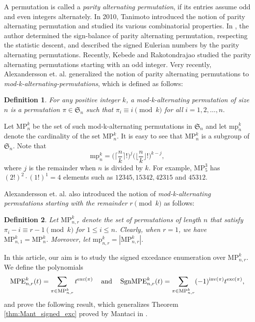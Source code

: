\documentclass[12pt]{article}
\newcommand{\MP}{\mathrm{MP}}
\newcommand{\MPE}{\mathrm{MPE}}
\newcommand{\SMPE}{\mathrm{SgnMPE}}
\newcommand{\mpa}{\mathrm{mp}}
\newcommand{\SSS}{\mathfrak{S}}
\newcommand{\inv}{\mathrm{inv}}
\newcommand{\exc}{\mathrm{exc}}
\newtheorem{definition}{\bf Definition}[section]
\begin{document}
 

A permutation is called a {\it parity alternating permutation}, if its entries assume odd and even integers alternately. In 2010, Tanimoto \cite{Tanimoto-parityalt-annals} introduced the notion of parity alternating permutation and studied its various combinatorial properties. In \cite{Tanimoto-parityalt-advances}, the author determined the sign-balance of parity alternating permutation, respecting the statistic descent, and described the signed Eulerian numbers by the parity alternating permutations. Recently, Kebede and Rakotondrajao \cite{kebede-rakotondrajao} studied the parity alternating permutations starting with an odd integer. Very recently,  Alexandersson et. al. \cite{alexandersson-rebede} generalized the notion of parity alternating permutations to {\it mod-k-alternating-permutations}, which is defined as follows:

\begin{definition}
For any positive integer $k$, a mod-k-alternating permutation of size $n$ is a permutation $\pi \in \SSS_n$ such that $\pi_i \equiv i \pmod k$ for all $i=1,2,\dots,n.$
\end{definition}

 Let $\MP_n^k$ be the set of such mod-k-alternating permutations in $\SSS_n$ and let $\mpa_n^k$ denote the cardinality of the set $\MP_n^k$. It is easy to see that $\MP_n^k$  is a subgroup of $\SSS_n$. Note that 
 $$\mpa_n^k=\Big(\Big \lceil \frac{n}{k}\Big \rceil !\Big)^{j}\Big(\Big \lfloor \frac{n}{k}\Big \rfloor !\Big)^{k-j},$$
where $j$ is the remainder when $n$ is divided by $k$. For example, $\MP_5^3$ has $(2!)^2\cdot (1!)^1=4$ elements such as $12345, 15342, 42315$ and $45312$.

 Alexandersson et. al. \cite{alexandersson-rebede} also introduced the notion of {\it mod-k-alternating permutations starting with the remainder $r \pmod k$} as follows:

\begin{definition}
Let $\MP_{n,r}^k$ denote the set of permutations of length $n$ that satisfy $\pi _i - i \equiv r-1 \pmod k$ for $1 \leq i \leq n$. Clearly, when $r=1$, we have $\MP_{n,1}^k= \MP_{n}^k$. Moreover, let $\mpa_{n,r}^k= |\MP_{n,r}^k|.$
\end{definition}

In this article, our aim is to study the signed excedance enumeration over $\MP_{n,r}^k$.  We define the polynomials
\[ \MPE_{n,r}^k(t)= \sum _{\pi \in \MP_{n,r}^k} t^{\exc(\pi)} \hspace{3 mm} \mbox{ and } \hspace{3 mm}
\SMPE_{n,r}^k(t)= \sum _{\pi \in \MP_{n,r}^k} (-1)^{\inv(\pi)} t^{\exc(\pi)},\] and prove the following result, which generalizes Theorem \ref{thm:Mant_signed_exc} proved by Mantaci in \cite{Mantaci-thesis}.
\end{document}
